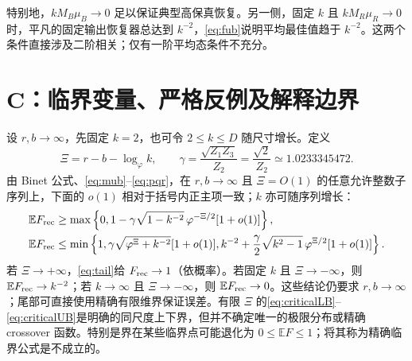 \documentclass[UTF8,a4paper,11pt]{ctexart}
\newcommand{\EE}{\mathbb E}
\newcommand{\ph}{\varphi}
\begin{document}
特别地，$kM_B\mu_B\to0$ 足以保证典型高保真恢复。另一侧，固定 $k$ 且 $kM_R\mu_R\to0$ 时，平凡的固定输出恢复器总达到 $k^{-2}$，\eqref{eq:fub}说明平均最佳值趋于 $k^{-2}$。这两个条件直接涉及二阶相关；仅有一阶平均态条件不充分。

\section{C：临界变量、严格反例及解释边界}
设 $r,b\to\infty$，先固定 $k=2$，也可令 $2\leq k\leq D$ 随尺寸增长。定义
\begin{equation}\label{eq:xi}
 \Xi=r-b-\log_{\ph}k,\qquad
 \gamma=\frac{\sqrt{Z_1Z_3}}{Z_2}=\frac{\sqrt2}{Z_2}
 \simeq1.0233345472.
\end{equation}
由 Binet 公式、\eqref{eq:mub}--\eqref{eq:pqr}，在 $r,b\to\infty$ 且 $\Xi=O(1)$ 的任意允许整数子序列上，下面的 $o(1)$ 相对于括号内正主项一致；$k$ 亦可随序列增长：
\begin{align}
 \EE F_{\rm rec}
 &\geq\max\left\{0,
 1-\gamma\sqrt{1-k^{-2}}\,\ph^{-\Xi/2}[1+o(1)]\right\},\label{eq:criticalLB}\\
 \EE F_{\rm rec}
 &\leq\min\left\{1,
 \gamma\sqrt{\ph^\Xi+k^{-2}}[1+o(1)],
 k^{-2}+\frac\gamma2\sqrt{k^2-1}\,\ph^{\Xi/2}[1+o(1)]\right\}.
 \label{eq:criticalUB}
\end{align}
若 $\Xi\to+\infty$，\eqref{eq:tail}给 $F_{\rm rec}\to1$（依概率）。若固定 $k$ 且 $\Xi\to-\infty$，则 $\EE F_{\rm rec}\to k^{-2}$；若 $k\to\infty$ 且 $\Xi\to-\infty$，则 $\EE F_{\rm rec}\to0$。这些结论仍要求 $r,b\to\infty$；尾部可直接使用精确有限维界保证误差。有限 $\Xi$ 的\eqref{eq:criticalLB}--\eqref{eq:criticalUB}是明确的同尺度上下界，但并不确定唯一的极限分布或精确 crossover 函数。特别是界在某些临界点可能退化为 $0\leq\EE F\leq1$；将其称为精确临界公式是不成立的。
\end{document}
